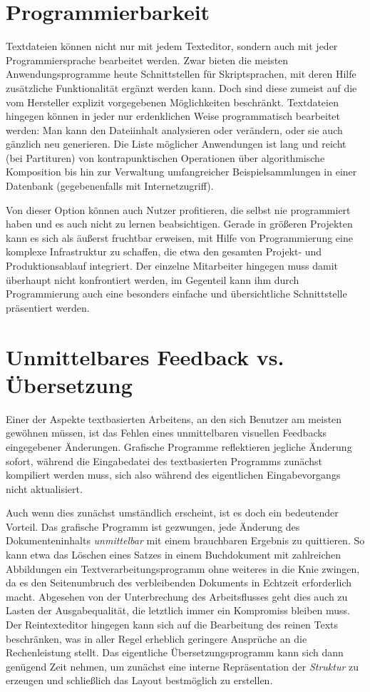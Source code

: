 \documentclass[DIV=12]{scrreprt}
\begin{document}
\section{Programmierbarkeit}
\label{sec:pt_programmability}
Textdateien können nicht nur mit jedem Texteditor, sondern auch mit jeder Programmiersprache bearbeitet werden.
Zwar bieten die meisten Anwendungsprogramme heute Schnittstellen für Skriptsprachen, mit deren Hilfe zusätzliche Funktionalität ergänzt werden kann.
Doch sind diese zumeist auf die vom Hersteller explizit vorgegebenen Möglichkeiten beschränkt.
Textdateien hingegen können in jeder nur erdenklichen Weise programmatisch bearbeitet werden: Man kann den Dateiinhalt analysieren oder verändern, oder sie auch gänzlich neu generieren.
Die Liste möglicher Anwendungen ist lang und reicht (bei Partituren) von kontrapunktischen Operationen über algorithmische Komposition bis hin zur Verwaltung umfangreicher Beispielsammlungen in einer Datenbank (gegebenenfalls mit Internetzugriff).

Von dieser Option können auch Nutzer profitieren, die selbst nie programmiert haben und es auch nicht zu lernen beabsichtigen.
Gerade in größeren Projekten kann es sich als äußerst fruchtbar erweisen, mit Hilfe von Programmierung eine komplexe Infrastruktur zu schaffen, die etwa den gesamten Projekt- und Produktionsablauf integriert.
Der einzelne Mitarbeiter hingegen muss damit überhaupt nicht konfrontiert werden, im Gegenteil kann ihm durch Programmierung auch eine besonders einfache und übersichtliche Schnittstelle präsentiert werden.


\section{Unmittelbares Feedback vs. Übersetzung}
\label{sec:pt_compiling-instant}
Einer der Aspekte textbasierten Arbeitens, an den sich Benutzer am meisten gewöhnen müssen, ist das Fehlen eines unmittelbaren visuellen Feedbacks eingegebener Änderungen.
Grafische Programme reflektieren jegliche Änderung sofort, während die Eingabedatei des textbasierten Programms zunächst kompiliert werden muss, sich also während des eigentlichen Eingabevorgangs nicht aktualisiert.

Auch wenn dies zunächst umständlich erscheint, ist es doch ein bedeutender Vorteil.
Das grafische Programm ist gezwungen, jede Änderung des Dokumenteninhalts \emph{unmittelbar} mit einem brauchbaren Ergebnis zu quittieren.
So kann etwa das Löschen eines Satzes in einem Buchdokument mit zahlreichen Abbildungen ein Textverarbeitungsprogramm ohne weiteres in die Knie zwingen, da es den Seitenumbruch des verbleibenden Dokuments in Echtzeit erforderlich macht.
Abgesehen von der Unterbrechung des Arbeitsflusses geht dies auch zu Lasten der Ausgabequalität, die letztlich immer ein Kompromiss bleiben muss.
Der Reintexteditor hingegen kann sich auf die Bearbeitung des reinen Texts beschränken, was in aller Regel erheblich geringere Ansprüche an die Rechenleistung stellt.
Das eigentliche Übersetzungsprogramm kann sich dann genügend Zeit nehmen, um zunächst eine interne Repräsentation der \emph{Struktur} zu erzeugen und schließlich das Layout bestmöglich zu erstellen.
\end{document}
